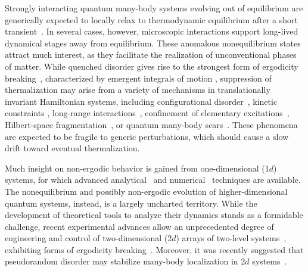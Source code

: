 \documentclass[reprint,aps,prl,superscriptaddress,english,nolongbibliography]{revtex4-2}
\begin{document}
Strongly interacting quantum many-body systems evolving out of equilibrium are generically expected to locally relax to  thermodynamic equilibrium after a short transient~\cite{Rigol2008Thermalization,Polkovnikov2011Colloquium}. In several cases, however, microscopic interactions support long-lived dynamical stages away from equilibrium. These anomalous nonequilibrium states attract much interest, as they facilitate the realization of unconventional phases of matter. While quenched disorder gives rise to the strongest form of ergodicity breaking~\cite{Anderson1958Absence,Basko2006MetalInsulator,Abanin2019Colloquium}, characterized by emergent integrals of motion \cite{serbyn2013local,huse2014phenomenology,ros2015integrals,imbrie2017local}, suppression of thermalization may arise from a variety of mechanisms in translationally invariant Hamiltonian systems, including configurational disorder~\cite{DeRoeck2014Asymptotic,DeRoeck2014Scenario,Carleo2012Localization,Michailidis2018Slow,Yao2016Quasi,Papic2015Many,Schiulaz2015Dynamics,Smith2017Disorder,Brenes2018Many,Karpov2021Disorder,Hart21logarithmic}, kinetic constraints \cite{Surace2020Lattice,Pancotti2020Quantum,Sierant2021Constraints,Oppong2020Probing,Orito21nonthermalized}, long-range interactions~\cite{KastnerPRL11_Diverging,mori2018prethermalization,neyenhuis2017observation,LerosePappalardiPRR20,Defenu2021Metastability,LeroseDWLR,GorshkovConfinement}, confinement of elementary excitations~\cite{Kormos2017Real,Robinson2019Nonthermal,Robinson2019Signatures,Lin2017Quasiparticle,Mazza2019Suppression,Lerose2020Quasilocalized,Verdel2020Real,Pai2020Fractons,Chanda2020Confinement,Magnifico2020Real,birnkammer2022prethermalization,Park19glassy}, Hilbert-space fragmentation~\cite{Nandkishore2019Fractons,Pretko2020Fracton,Sala2020Ergodicity,Khemani2020Localization,bastianello2021fragmentation}, or quantum many-body scars~\cite{Turner2018Weak,Serbyn2021Quantum}.
These phenomena are expected to be fragile to generic perturbations, which should cause a slow drift toward eventual thermalization.

Much insight on non-ergodic behavior is gained from one-dimensional (1$d$) systems, for which advanced analytical~\cite{korepin1993quantum,giamarchi2003quantum} and numerical~\cite{Schollwock2011Density} techniques are available. The nonequilibrium and possibly non-ergodic evolution of higher-dimensional quantum systems, instead, is a largely uncharted territory. While the development of theoretical tools to analyze their dynamics  stands as a formidable  challenge, recent experimental advances allow an unprecedented degree of engineering and control of two-dimensional (2$d$) arrays of two-level systems~\cite{labuhn2016tunable,Guardado2018Probing,scholl2021quantum,ebadi2021quantum,Bluvstein2022Quantum}, exhibiting forms of ergodicity breaking~\cite{bluvstein2021controlling}. Moreover, it was recently suggested that pseudorandom disorder may stabilize many-body localization in 2$d$ systems~\cite{agrawal2022note,Strkalj2022Coexistence,crowley2022mean}.
\end{document}
